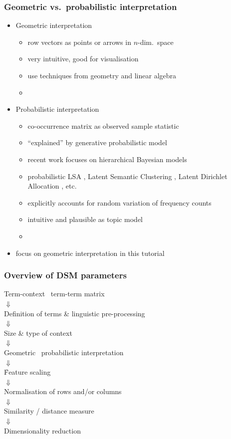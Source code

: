 \documentclass[t]{beamer} %
\begin{document}
\begin{frame}
  \frametitle{Geometric vs.\ probabilistic interpretation}

  \begin{itemize}
  \item Geometric interpretation
    \begin{itemize}
    \item row vectors as points or arrows in $n$-dim.\ space
    \item very intuitive, good for visualisation
    \item use techniques from geometry and linear algebra
    \item[]
    \end{itemize}
    \pause
  \item Probabilistic interpretation
    \begin{itemize}
    \item co-occurrence matrix as observed sample statistic
    \item ``explained'' by generative probabilistic model
    \item recent work focuses on hierarchical Bayesian models
    \item probabilistic LSA \citep{Hoffmann:99}, Latent Semantic
      Clustering \citep{Rooth:etc:99}, Latent Dirichlet Allocation
      \citep{Blei:Ng:Jordan:03}, etc.
    \item explicitly accounts for random variation of frequency counts
    \item intuitive and plausible as topic model
    \item[]
    \end{itemize}
    \pause
  \item[\hand] focus on geometric interpretation in this tutorial
  \end{itemize}
\end{frame}

\begin{frame}
  \frametitle{Overview of DSM parameters}

  \ungap[1]
  \begin{center}
    Term-context \vs\ term-term matrix\\
    $\Downarrow$\\
    Definition of terms \& linguistic pre-processing\\
    $\Downarrow$\\
    Size \& type of context\\
    $\Downarrow$\\
    Geometric \vs\ probabilistic interpretation\\
    $\Downarrow$\\
    \h{Feature scaling}\\
    $\Downarrow$\\
    Normalisation of rows and/or columns\\
    $\Downarrow$\\
    Similarity / distance measure\\
    $\Downarrow$\\
    Dimensionality reduction
  \end{center}
\end{frame}
\end{document}

